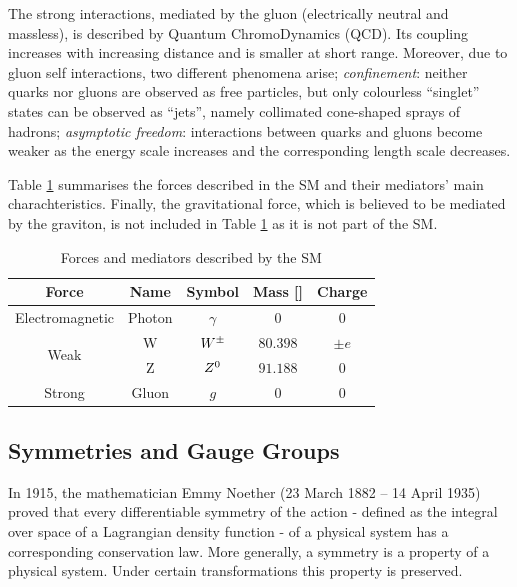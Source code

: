 			The strong interactions, mediated by the gluon (electrically neutral and massless), is described by Quantum ChromoDynamics (QCD). Its coupling increases with increasing distance and is smaller at short range. Moreover, due to gluon self interactions, two different phenomena arise; \emph{confinement}: neither quarks nor gluons are observed as free particles, but only colourless “singlet” states can be observed as “jets”, namely collimated cone-shaped sprays of hadrons; \emph{asymptotic freedom}: interactions between quarks and gluons become weaker as the energy scale increases and the corresponding length scale decreases.

			Table \ref{tab:interactions} summarises the forces described in the SM and their mediators' main charachteristics. Finally, the gravitational force, which is believed to be mediated by the graviton, is not included in Table \ref{tab:interactions} as it is not part of the SM.

			\begin{table}[!htb]\centering\caption{Forces and mediators described by the SM}							
				\begin{tabular}{c|c|c|c|c}
					\hline \hline
					\textbf{Force} & \textbf{Name} & \textbf{Symbol} & \textbf{Mass} [\GeV]& \textbf{Charge} \\ \hline \hline
					Electromagnetic & Photon & $\gamma$ & 0 & 0 \\ \hline
					\multirow{2}{*}{Weak} & W & $W^{\pm}$ & $80.398$ & $\pm e$ \\
					& Z & $Z^0$ & $91.188$ & 0 \\\hline
					Strong & Gluon & $g$ & $0$ & $0$ \\\hline\hline
				\end{tabular}						
			\label{tab:interactions} 
			\end{table}



		\subsection*{Symmetries and Gauge Groups}

			In 1915, the mathematician Emmy Noether (23 March 1882 – 14 April 1935) proved that every differentiable symmetry of the action - defined as the integral over space of a Lagrangian density function - of a physical system has a corresponding conservation law. More generally, a symmetry is a property of a physical system. Under certain transformations this property is preserved. 

